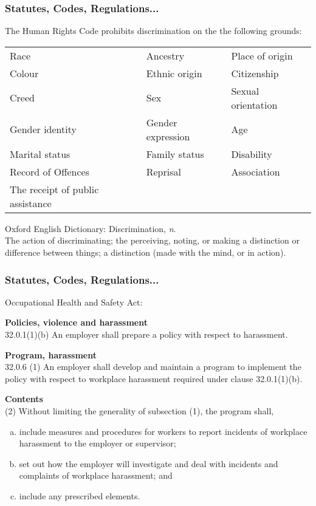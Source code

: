\begin{frame}
\frametitle{Statutes, Codes, Regulations...}

The Human Rights Code prohibits discrimination
on the the following grounds:

\begin{tabular}{l l l}
		Race & Ancestry	& Place of origin \\
		Colour & Ethnic origin & Citizenship\\
		Creed & Sex & Sexual orientation\\
		Gender identity & Gender expression	& Age\\
		Marital status & Family status & Disability\\
		Record of Offences & Reprisal & Association\\
		The receipt of public assistance & &\\
\end{tabular}

Oxford English Dictionary: Discrimination, \textit{n}.\\
	The action of discriminating; the perceiving, noting, or making a distinction
	or difference between things; a distinction (made with the mind, or in action). 

\end{frame}



\begin{frame}
\frametitle{Statutes, Codes, Regulations...}

Occupational Health and Safety Act:


\textbf{Policies, violence and harassment}\\
	32.0.1(1)(b) An employer shall prepare a policy with respect to
harassment.

\textbf{Program, harassment}\\
	32.0.6  (1)  An employer shall develop and maintain a program to implement the policy with respect to workplace harassment required under clause 32.0.1(1)(b).

\textbf{Contents}\\
	(2)  Without limiting the generality of subsection (1), the program shall,
\begin{enumerate}[(a)]
\item include measures and procedures for workers to report incidents of workplace harassment to the employer or supervisor;
\item set out how the employer will investigate and deal with incidents and complaints of workplace harassment; and
\item include any prescribed elements.
\end{enumerate}

\end{frame}



